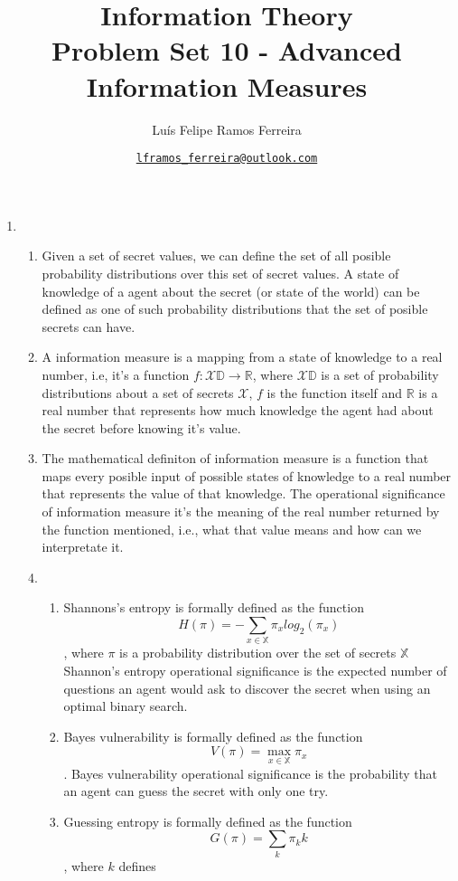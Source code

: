 \documentclass{article}
\title{Information Theory \\ \large Problem Set 10 - Advanced Information Measures}
\author{Luís Felipe Ramos Ferreira}
\date{\href{mailto:lframos\_ferreira@outlook.com}{\texttt{lframos\_ferreira@outlook.com}}
}
\begin{document}
\maketitle

\begin{enumerate}
	\item \begin{enumerate}
		      \item Given a set of secret values, we can define the set of all posible probability distributions over this set of secret values. A state of knowledge of a agent about
		            the secret (or state of the world) can be defined as one of such probability distributions that the set of posible secrets can have.

		      \item A information measure is a mapping from a state of knowledge to a real number, i.e, it's a function \(f: \mathcal{X} \mathbb{D} \rightarrow \mathbb{R}\), where \(\mathcal{X} \mathbb{D}\)
		            is a set of probability distributions about a set of secrets \(\mathcal{X}\), \(f\) is the function itself and \(\mathbb{R}\) is a real number that represents how much knowledge the agent had about the secret
		            before knowing it's value.
		      \item The mathematical definiton of information measure is a function that maps every posible input of possible states of knowledge to a real number that represents the value of that knowledge. The operational significance
		            of information measure it's the meaning of the real number returned by the function mentioned, i.e., what that value means and how can we interpretate it.
		      \item \begin{enumerate}
			            \item Shannons's entropy is formally defined as the function \[H(\pi) = -\sum_{x \in \mathbb{X}} \pi_x log_2(\pi_x)\], where \(\pi\) is a probability distribution over the set of secrets \(\mathbb{X}\)
			                  Shannon's entropy operational significance is the expected number of questions an agent would ask to discover the secret when using an optimal binary search.
			            \item Bayes vulnerability is formally defined as the function \[V(\pi) = \max_{x \in \mathbb{X}} \pi_x\]. Bayes vulnerability operational
			                  significance is the probability that an agent can guess the secret with only one try.
			            \item Guessing entropy is formally defined as the function \[G(\pi) = \sum_k \pi_k k\], where \(k\) defines

\end{enumerate}
\end{enumerate}
\end{enumerate}
\end{document}
